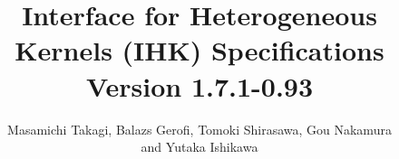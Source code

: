 \documentclass[twoside,11pt,fleqn]{book}
\begin{document}
\title{Interface for Heterogeneous Kernels (IHK) Specifications\\
  Version 1.7.1-0.93
}

\author{Masamichi Takagi, Balazs Gerofi, Tomoki Shirasawa, Gou Nakamura\\ and Yutaka Ishikawa}

\def\gb{\penalty10000\hskip 0pt plus 8 em\penalty4800\hskip 0pt plus-8em\penalty10000}

\newcommand{\typefacetype}[1]{\gb{\sf #1}}
\newcommand{\subtype}[1]{\textsf{\textbf{#1}}}
\newcommand{\typefacearg}[1]{\gb{\sf #1}}
\newcommand{\declarefunc}[1]{{\raggedright \hangindent 7em\hangafter=1\tt #1 \par \vspace{0.0in}}}
\newcommand{\funcarg}[3]{\item[\hbox to 70pt{\typefacearg{#1} \hfill} \typefacetype{#2}\hfill]{\small #3}}
\newcommand{\typefield}[2]{\item[\hbox to 70pt{\typefacearg{#1} \hfill} \hfill]{\small #2}}
\newcommand{\IN}[0]{{\small \bf{input}}}
\newcommand{\OUT}[0]{{\small \bf{output}}}
\newcommand{\INOUT}[0]{{\small \bf{inout}}}

\newlength{\codeSpace}
\setlength{\codeSpace}{.4cm}

\newenvironment{funcdef}[0]{
\noindent
\samepage
   \begin{list}
{}{
      \setlength{\leftmargin}{100pt}
      \setlength{\labelwidth}{80pt}
      \setlength{\labelsep}{10pt}
      \setlength{\itemindent}{0pt}
      \setlength{\itemsep}{0pt}
      \setlength{\topsep}{5pt}
   }
}
{
   \end{list}
}
\newenvironment{structdef}[0]{
\noindent
\samepage
   \begin{list}
{}{
      \setlength{\leftmargin}{80pt}
      \setlength{\labelwidth}{60pt}
      \setlength{\labelsep}{10pt}
      \setlength{\itemindent}{0pt}
      \setlength{\itemsep}{0pt}
      \setlength{\topsep}{5pt}
   }
}
{
   \end{list}
   \vspace{\codeSpace}
}

\date{}
\maketitle
\end{document}
